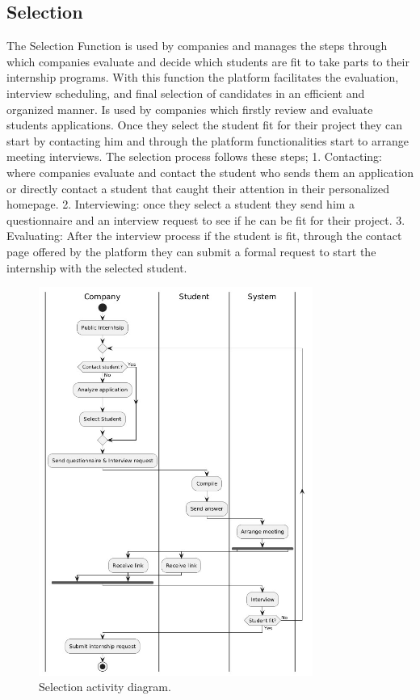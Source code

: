 \subsection{Selection}
The Selection Function is used by companies and manages the steps through which companies evaluate and decide which students are fit to take parts to their internship programs. With this function the platform facilitates the evaluation, interview scheduling, and final selection of candidates in an efficient and organized manner. Is used by companies which firstly review and evaluate students applications. Once they select the student fit for their project they can start by contacting him and through the platform functionalities start to arrange meeting interviews. 
The selection process follows these steps;
1.	Contacting: where companies evaluate and contact the student who sends them an application or directly contact a student that caught their attention in their personalized homepage.
2.	Interviewing: once they select a student they  send him a questionnaire and an interview request to see if he can be fit for their project. 
3. Evaluating: After the interview process if the student is fit, through the contact page offered by the platform they can submit a formal request to start the internship with the selected student.
\begin{figure}[H]
        \centering
        \includegraphics[width=0.8\textwidth]{RASD/Assets/ActivityDiagram/Selection_AD.png}
        \caption{Selection activity diagram.}
        \label{fig:Selection activity diagram.}
    \end{figure}
